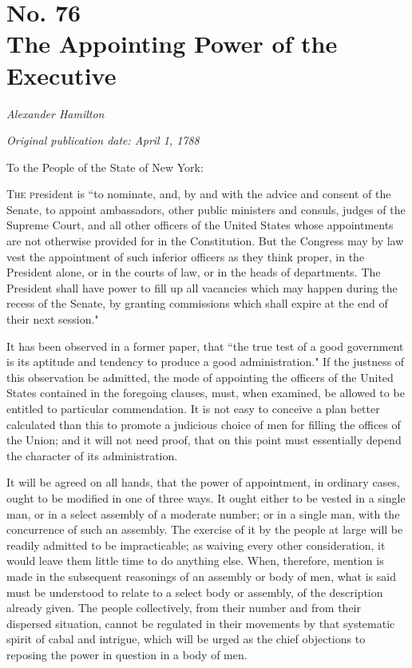 \chapter[No. 76: The Appointing Power of the Executive]{No. 76\\ {\small The Appointing Power of the Executive}}

\textit{Alexander Hamilton}

\textit{Original publication date: April 1, 1788}
\vspace{1cm}

To the People of the State of New York:
\vspace{.4cm}

\textsc{The p}resident is ``to nominate, and, by and with the advice and consent of the Senate, to appoint ambassadors, other public ministers and consuls, judges of the Supreme Court, and all other officers of the United States whose appointments are not otherwise provided for in the Constitution. 
But the Congress may by law vest the appointment of such inferior officers as they think proper, in the President alone, or in the courts of law, or in the heads of departments. 
The President shall have power to fill up all vacancies which may happen during the recess of the Senate, by granting commissions which shall expire at the end of their next session."

It has been observed in a former paper, that ``the true test of a good government is its aptitude and tendency to produce a good administration." If the justness of this observation be admitted, the mode of appointing the officers of the United States contained in the foregoing clauses, must, when examined, be allowed to be entitled to particular commendation. 
It is not easy to conceive a plan better calculated than this to promote a judicious choice of men for filling the offices of the Union; and it will not need proof, that on this point must essentially depend the character of its administration.

It will be agreed on all hands, that the power of appointment, in ordinary cases, ought to be modified in one of three ways. 
It ought either to be vested in a single man, or in a select assembly of a moderate number; or in a single man, with the concurrence of such an assembly. 
The exercise of it by the people at large will be readily admitted to be impracticable; as waiving every other consideration, it would leave them little time to do anything else. 
When, therefore, mention is made in the subsequent reasonings of an assembly or body of men, what is said must be understood to relate to a select body or assembly, of the description already given. 
The people collectively, from their number and from their dispersed situation, cannot be regulated in their movements by that systematic spirit of cabal and intrigue, which will be urged as the chief objections to reposing the power in question in a body of men.

